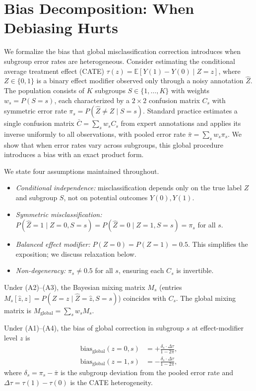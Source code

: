 
\section{Bias Decomposition: When Debiasing Hurts}
\label{sec:theory}

We formalize the bias that global misclassification correction introduces when subgroup error rates are heterogeneous.
Consider estimating the conditional average treatment effect (CATE) $\tau(z) = \mathbb{E}[Y(1) - Y(0) \mid Z = z]$, where $Z \in \{0, 1\}$ is a binary effect modifier observed only through a noisy annotation $\hat{Z}$.
The population consists of $K$ subgroups $S \in \{1, \ldots, K\}$ with weights $w_s = P(S{=}s)$, each characterized by a $2 \times 2$ confusion matrix $C_s$ with symmetric error rate $\pi_s = P(\hat{Z} \neq Z \mid S{=}s)$.
Standard practice estimates a single confusion matrix $\bar{C} = \sum_s w_s C_s$ from expert annotations and applies its inverse uniformly to all observations, with pooled error rate $\bar{\pi} = \sum_s w_s \pi_s$.
We show that when error rates vary across subgroups, this global procedure introduces a bias with an exact product form.

We state four assumptions maintained throughout.
%
\begin{itemize}
\item[\textbf{(A1)}] \textit{Conditional independence:} misclassification depends only on the true label $Z$ and subgroup $S$, not on potential outcomes $Y(0), Y(1)$.
\item[\textbf{(A2)}] \textit{Symmetric misclassification:} $P(\hat{Z}{=}1 \mid Z{=}0, S{=}s) = P(\hat{Z}{=}0 \mid Z{=}1, S{=}s) = \pi_s$ for all $s$.
\item[\textbf{(A3)}] \textit{Balanced effect modifier:} $P(Z{=}0) = P(Z{=}1) = 0.5$. This simplifies the exposition; we discuss relaxation below.
\item[\textbf{(A4)}] \textit{Non-degeneracy:} $\pi_s \neq 0.5$ for all $s$, ensuring each $C_s$ is invertible.
\end{itemize}

Under (A2)--(A3), the Bayesian mixing matrix $M_s$ (entries $M_s[\hat{z}, z] = P(Z{=}z \mid \hat{Z}{=}\hat{z}, S{=}s)$) coincides with $C_s$.
The global mixing matrix is $M_{\text{global}} = \sum_s w_s M_s$.

\begin{proposition}
\label{prop:bias_identity}
Under \textnormal{(A1)--(A4)}, the bias of global correction in subgroup $s$ at effect-modifier level $z$ is
\begin{align}
\mathrm{bias}_{\mathrm{global}}(z{=}0, s) &= +\frac{\delta_s \cdot \Delta\tau}{1 - 2\bar{\pi}}, \label{eq:bias_z0} \\
\mathrm{bias}_{\mathrm{global}}(z{=}1, s) &= -\frac{\delta_s \cdot \Delta\tau}{1 - 2\bar{\pi}}, \label{eq:bias_z1}
\end{align}
where $\delta_s = \pi_s - \bar{\pi}$ is the subgroup deviation from the pooled error rate and $\Delta\tau = \tau(1) - \tau(0)$ is the CATE heterogeneity.
\end{proposition}

